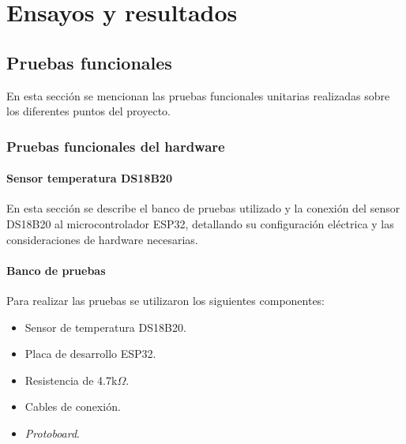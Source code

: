 \chapter{Ensayos y resultados} 

\label{ChapterEnsayosResultados} 


\section{Pruebas funcionales}
\label{sec:pruebas}
En esta sección se mencionan las pruebas funcionales unitarias realizadas sobre los diferentes puntos del proyecto.

\subsection{Pruebas funcionales del hardware}
\label{sec:pruebasHW}

\subsubsection{Sensor temperatura DS18B20}
En esta sección se describe el banco de pruebas utilizado y la conexión del sensor DS18B20 al microcontrolador ESP32, detallando su configuración eléctrica y las consideraciones de hardware necesarias.

\subsubsection{Banco de pruebas}
Para realizar las pruebas se utilizaron los siguientes componentes:
\begin{itemize}
    \item Sensor de temperatura DS18B20.
    \item Placa de desarrollo ESP32.
    \item Resistencia de 4.7k$\Omega$.
    \item Cables de conexión.
    \item \textit{Protoboard}.
\end{itemize}

